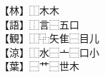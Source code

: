 \documentclass[17pt]{extarticle}
\begin{document}
\noindent{}%
【林】⿰木木\\
【語】⿰言⿱五口\\
【観】⿰⿻矢隹⿱目儿\\
【涼】⿰水⿱亠⿱口小\\
【葉】⿱艹⿱世木
\end{document}
